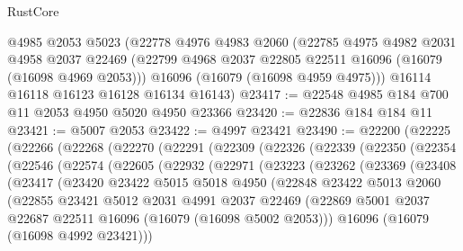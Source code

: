 \begin{lexlean}{RustCore}
\begin{coremodule}
    @4985
    @2053
    @5023
    (@22778
      @4976
      @4983
      @2060
      (@22785
        @4975
        @4982
        @2031
        @4958
        @2037
        @22469
        (@22799 @4968 @2037 @22805 @22511 @16096 (@16079 (@16098 @4969 @2053)))
        @16096
        (@16079 (@16098 @4959 @4975)))
      @16114
      @16118
      @16123
      @16128
      @16134
      @16143)
@23417 := @22548 @4985 @184 @700 @11 @2053 @4950 @5020 @4950 @23366
@23420 := @22836 @184 @184 @11
@23421 := @5007 @2053
@23422 := @4997 @23421
@23490 := @22200
    (@22225
      (@22266
        (@22268
          (@22270
            (@22291
              (@22309
                (@22326
                  (@22339
                    (@22350
                      (@22354
                        (@22546
                          (@22574
                            (@22605
                              (@22932
                                (@22971
                                  (@23223
                                    (@23262
                                      (@23369
                                        (@23408
                                          (@23417
                                            (@23420
                                              @23422
                                              @5015
                                              @5018
                                              @4950
                                              (@22848
                                                @23422
                                                @5013
                                                @2060
                                                (@22855
                                                  @23421
                                                  @5012
                                                  @2031
                                                  @4991
                                                  @2037
                                                  @22469
                                                  (@22869
                                                    @5001
                                                    @2037
                                                    @22687
                                                    @22511
                                                    @16096
                                                    (@16079 (@16098 @5002 @2053)))
                                                  @16096
                                                  (@16079 (@16098 @4992 @23421)))

\end{coremodule}
\end{lexlean}
